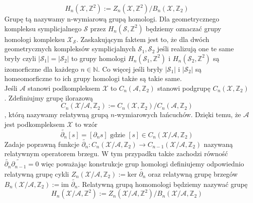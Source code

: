 \documentclass[12pt,a4paper]{article}
\newcommand{\fun}[3]{#1:#2 \rightarrow #3}
\begin{document}
$$H_n(\mathcal{X},\mathbb{Z}^2):= Z_n(\mathcal{X},\mathbb{Z}^2)/B_n(\mathcal{X},\mathbb{Z}_2) $$
Grupę tą nazywamy n-wymiarową grupą homologi. Dla geometrycznego kompleksu symplicjalnego $\mathcal{S}$ przez $H_n(\mathcal{S},\mathbb{Z}^2)$ będziemy oznaczać grupy homologi kompleksu $\mathcal{X}_\mathcal{S}$. Zaskakującym faktem jest to, że dla dwóch geometrycznych kompleksów symplicjalnych $\mathcal{S}_1,\mathcal{S}_2$ jeśli realizują one te same bryły czyli $|\mathcal{S}_1|=|\mathcal{S}_2|$ to grupy homologi $H_n(\mathcal{S}_1,\mathbb{Z}^2)$ i $H_n(\mathcal{S}_2,\mathbb{Z}^2)$ są izomorficzne dla każdego $n\in \mathbb{N}$. Co więcej jeśli bryły $|\mathcal{S}_1|$ i $|\mathcal{S}_2| $ są homeomorficzne to ich grupy homologi także są takie same.
\\Jeśli $\mathcal{A}$ stanowi podkompleksem $\mathcal{X}$ to $C_n(\mathcal{A},\mathbb{Z}_2) $ stanowi podgrupę $C_n(\mathcal{X},\mathbb{Z}_2) $. Zdefiniujmy grupę ilorazową
$$C_n(\mathcal{X}/\mathcal{A},\mathbb{Z}_2):=C_n(\mathcal{X},\mathbb{Z}_2)/C_n(\mathcal{A},\mathbb{Z}_2)$$
, którą nazywamy relatywną grupą $n$-wymiarowych łańcuchów. Dzięki temu, że $\mathcal{A}$ jest podkompleksem $\mathcal{X}$ to wzór 
$$\widetilde{\partial_n} [s] = [\partial_n s]\text{ gdzie }[s]\in C_n(\mathcal{X}/\mathcal{A},\mathbb{Z}_2) $$
Zadaje poprawną funkcje $\fun{\widetilde{\partial_n}}{C_n(\mathcal{X}/\mathcal{A},\mathbb{Z}_2)} {C_{n-1}(\mathcal{X}/\mathcal{A},\mathbb{Z}_2)}$ nazywaną relatywnym operatorem brzegu. W tym przypadku także zachodzi równość $\widetilde{\partial_n} \widetilde{\partial_{n-1}}=0$ więc  poważając konstrukcje grup homologi definiujemy odpowiednio relatywną grupę cykli $Z_n(\mathcal{X}/\mathcal{A},\mathbb{Z}_2):=\text{ker }\widetilde{\partial_n}$ oraz relatywną grupę brzegów  $B_n(\mathcal{X}/\mathcal{A},\mathbb{Z}_2):=\text{im }\widetilde{\partial_n}$. Relatywną grupą homomologi będziemy nazywać grupę
$$H_n(\mathcal{X}/\mathcal{A},\mathbb{Z}^2):= Z_n(\mathcal{X}/\mathcal{A},\mathbb{Z}^2)/B_n(\mathcal{X}/\mathcal{A},\mathbb{Z}_2) $$
\end{document}
